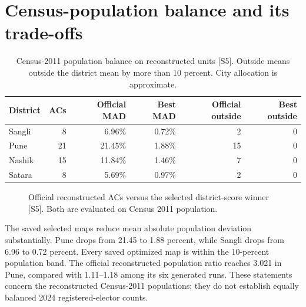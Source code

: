 \documentclass[11pt,a4paper,oneside]{report}
\begin{document}
\section{Census-population balance and its trade-offs}
\begin{table}[htbp]\centering
\small
\setlength{\tabcolsep}{5pt}
\caption{Census-2011 population balance on reconstructed units [S5]. Outside means outside the district mean by more than 10 percent. City allocation is approximate.}
\begin{tabular}{lrrrrr}
\toprule
District & ACs & Official MAD & Best MAD & Official outside & Best outside\\
\midrule
Sangli & 8 & 6.96\% & 0.72\% & 2 & 0\\
Pune & 21 & 21.45\% & 1.88\% & 15 & 0\\
Nashik & 15 & 11.84\% & 1.46\% & 7 & 0\\
Satara & 8 & 5.69\% & 0.97\% & 2 & 0\\
\bottomrule\end{tabular}
\end{table}
\begin{figure}[htbp]\centering
{}
\caption{Official reconstructed ACs versus the selected district-score winner [S5]. Both are evaluated on Census 2011 population.}\end{figure}
The saved selected maps reduce mean absolute population deviation substantially. Pune drops from 21.45 to 1.88 percent, while Sangli drops from 6.96 to 0.72 percent. Every saved optimized map is within the 10-percent population band. The official reconstructed population ratio reaches 3.021 in Pune, compared with 1.11--1.18 among its six generated runs. These statements concern the reconstructed Census-2011 populations; they do not establish equally balanced 2024 registered-elector counts.
\end{document}
